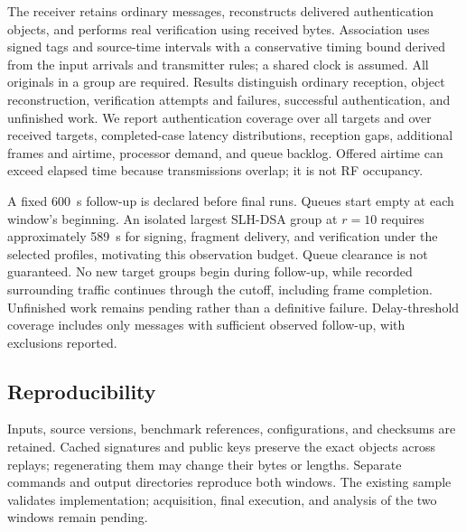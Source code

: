 The receiver retains ordinary messages, reconstructs delivered authentication
objects, and performs real verification using received bytes. Association
uses signed tags and source-time intervals with a conservative timing bound
derived from the input arrivals and transmitter rules; a shared clock is
assumed. All originals in a group are required. Results distinguish
ordinary reception, object reconstruction, verification attempts and
failures, successful authentication, and unfinished work. We report
authentication coverage over all targets and over received targets,
completed-case latency distributions, reception gaps, additional frames
and airtime, processor demand, and queue backlog. Offered airtime can
exceed elapsed time because transmissions overlap; it is not RF occupancy.

A fixed 600~s follow-up is declared before final runs. Queues start empty
at each window's beginning. An isolated largest
SLH-DSA group at $r=10$ requires approximately 589~s for signing, fragment
delivery, and verification under the selected profiles, motivating this
observation budget. Queue clearance is not guaranteed. No new target
groups begin during follow-up, while recorded surrounding traffic
continues through the cutoff, including frame completion. Unfinished work
remains pending rather than a definitive failure. Delay-threshold coverage
includes only messages with sufficient observed follow-up, with exclusions
reported.

\subsection{Reproducibility}
\label{subsec:reproducibility}

Inputs, source versions, benchmark references, configurations, and checksums
are retained. Cached signatures and public keys preserve the exact objects
across replays; regenerating them may change their bytes or lengths.
Separate commands and output directories reproduce both windows. The
existing sample validates implementation; acquisition, final execution,
and analysis of the two windows remain pending.
